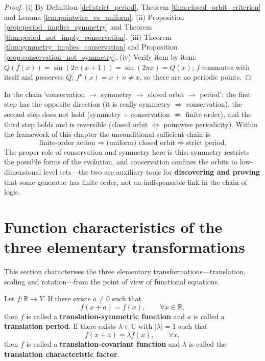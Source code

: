 \begin{proof}
(i) By Definition \ref{def:strict_period}, Theorem \ref{thm:closed_orbit_criterion} and Lemma \ref{lem:pointwise_vs_uniform}. (ii) Proposition \ref{prop:period_implies_symmetry} and Theorem \ref{thm:period_not_imply_conservation}. (iii) Theorem \ref{thm:symmetry_implies_conservation} and Proposition \ref{prop:conservation_not_symmetry}. (iv) Verify item by item: $Q(f(x))=\sin(2\pi(x+1))=\sin(2\pi x)=Q(x)$; $f$ commutes with itself and preserves $Q$; $f^n(x)=x+n\neq x$, so there are no periodic points.
\end{proof}

\begin{remark}\label{rem:chain_verdict}
In the chain `conservation $\to$ symmetry $\to$ closed orbit $\to$ period': the first step has the opposite direction (it is really symmetry $\Rightarrow$ conservation), the second step does not hold (symmetry $+$ conservation $\nRightarrow$ finite order), and the third step holds and is reversible (closed orbit $\iff$ pointwise periodicity). Within the framework of this chapter the unconditional sufficient chain is
\[
\text{finite-order action}\Longrightarrow\text{(uniform) closed orbit}\Longrightarrow\text{strict period}.
\]
The proper role of conservation and symmetry here is this: symmetry restricts the possible forms of the evolution, and conservation confines the orbits to low-dimensional level sets---the two are auxiliary tools for \textbf{discovering and proving} that some generator has finite order, not an indispensable link in the chain of logic.
\end{remark}

\section{Function characteristics of the three elementary transformations}
\label{sec:function_features_transformations}

This section characterises the three elementary transformations---translation, scaling and rotation---from the point of view of functional equations.

\begin{definition}\label{def:translation_symmetric_function}
Let $f:\mathbb{R}\to Y$. If there exists $a\neq 0$ such that
\[
f(x+a)=f(x),\qquad \forall x\in\mathbb{R},
\]
then $f$ is called a \textbf{translation-symmetric function} and $a$ is called a \textbf{translation period}. If there exists $\lambda\in\mathbb{C}$ with $|\lambda|=1$ such that
\[
f(x+a)=\lambda f(x),\qquad \forall x,
\]
then $f$ is called a \textbf{translation-covariant function} and $\lambda$ is called the \textbf{translation characteristic factor}.
\end{definition}

